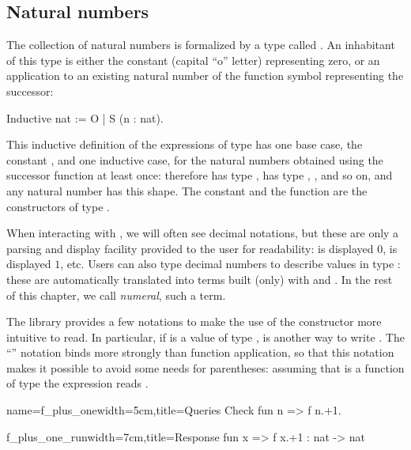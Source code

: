 \subsection{Natural numbers}
\label{ssec:nat}

The collection of natural numbers is formalized by a type called
. An inhabitant of this type is either the constant 
(capital ``o'' letter) representing zero, or an
application to an existing natural number of the function symbol 
representing the successor:

\begin{coq}{}{}
Inductive nat := O | S (n : nat).
\end{coq}

This inductive definition of the expressions of type  has one
base case, the constant , and one inductive case, for the natural
numbers obtained using the successor function at least once: therefore
 has type ,  has type , , and
so on, and any natural number has this shape. The constant  and
the function  are the constructors of type .

When interacting with
\Coq{}, we will often see decimal
notations, but these are only a parsing and display
facility provided to the user for readability:  is displayed
$0$,  is displayed $1$, etc.  Users can also type decimal
numbers to describe values in type : these are automatically
translated into terms built (only) with  and . In the rest
of this chapter, we call \emph{numeral}, such a term.

The \mcbMC{} library provides a few notations to make the use of the
constructor  more intuitive to read.  In particular, if 
is a value of type ,  is another way to write
.  The ``'' notation binds more strongly than function
application, so that this notation makes it possible to avoid some
needs for parentheses: assuming  that  is a function of type
 the expression  reads
.

\begin{coq}{name=f_plus_one}{width=5cm,title=Queries}
Check fun n => f n.+1.
\end{coq}
\begin{coqout}{f_plus_one_run}{width=7cm,title=Response}
fun x => f x.+1 : nat -> nat
\end{coqout}

